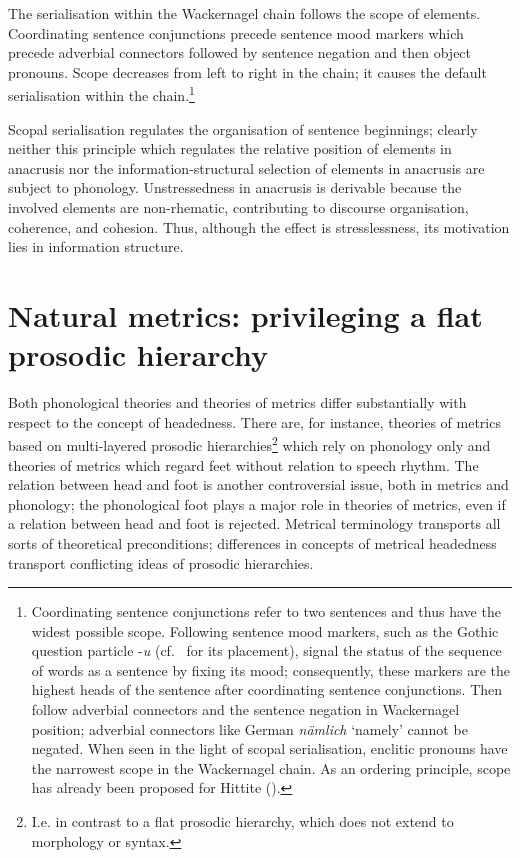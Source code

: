 \documentclass[output=paper
  ,nobabel
  ,uniformtopskip %
]{langscibook}
\begin{document}

The serialisation within the Wackernagel chain follows the scope of elements. Coordinating sentence conjunctions precede sentence mood markers which precede adverbial connectors followed by sentence negation and then object pronouns. Scope decreases from left to right in the chain; it causes the default serialisation within the chain.\footnote{Coordinating sentence conjunctions refer to two sentences and thus have the widest possible scope. Following sentence mood markers, such as the Gothic question particle -\textit{u} (cf.\ \citealp{NoelAzizHanna2013a} for its placement), signal the status of the sequence of words as a sentence by fixing its mood; consequently, these markers are the highest heads of the sentence after coordinating sentence conjunctions. Then follow adverbial connectors and the sentence negation in Wackernagel position; adverbial connectors like German \textit{nämlich} `namely' cannot be negated. When seen in the light of scopal serialisation, enclitic pronouns have the narrowest scope in the Wackernagel chain. As an ordering principle, scope has already been proposed for Hittite (\cite{Luraghi1990}).}  

Scopal serialisation regulates the organisation of sentence beginnings; clearly neither this principle which regulates the relative position of elements in anacrusis nor the information-structural selection of elements in anacrusis are subject to phonology. Unstressedness in anacrusis is derivable because the involved elements are non-rhematic, contributing to discourse organisation, coherence, and cohesion. Thus, although the effect is stresslessness, its motivation lies in information structure.

\section{Natural metrics: privileging a flat prosodic hierarchy}\label{sec-natmetrics} 

Both phonological theories and theories of metrics differ substantially with respect to the concept of headedness. There are, for instance, theories of metrics based on multi-layered prosodic hierarchies\footnote{I.e. in contrast to a flat prosodic hierarchy, which does not extend to morphology or syntax.} which rely on phonology only and theories of metrics which regard feet without relation to speech rhythm. The relation between head and foot is another controversial issue, both in metrics and phonology; the phonological foot plays a major role in theories of metrics, even if a relation between head and foot is rejected. Metrical terminology transports all sorts of theoretical preconditions; differences in concepts of metrical headedness transport conflicting ideas of prosodic hierarchies. 
\end{document}
